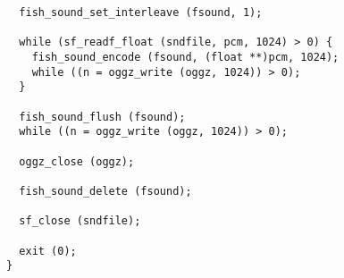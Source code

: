 \begin{verbatim}
  fish_sound_set_interleave (fsound, 1);

  while (sf_readf_float (sndfile, pcm, 1024) > 0) {
    fish_sound_encode (fsound, (float **)pcm, 1024);
    while ((n = oggz_write (oggz, 1024)) > 0);
  }

  fish_sound_flush (fsound);
  while ((n = oggz_write (oggz, 1024)) > 0);

  oggz_close (oggz);

  fish_sound_delete (fsound);

  sf_close (sndfile);

  exit (0);
}
\end{verbatim}
\normalsize
 